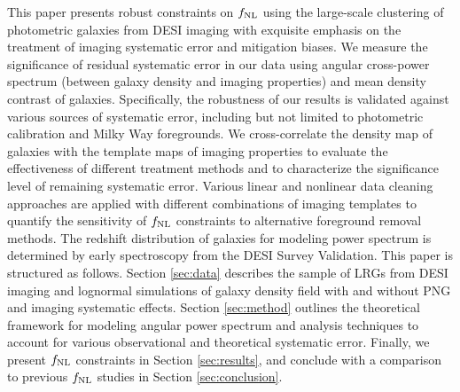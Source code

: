 This paper presents robust constraints on $f_{\rm NL}$ using the large-scale clustering of photometric galaxies from DESI imaging with exquisite emphasis on the treatment of imaging systematic error and mitigation biases. We measure the significance of residual systematic error in our data using angular cross-power spectrum (between galaxy density and imaging properties) and mean density contrast of galaxies. Specifically, the robustness of our results is validated against various sources of systematic error, including but not limited to photometric calibration and Milky Way foregrounds. We cross-correlate the density map of galaxies with the template maps of imaging properties to evaluate the effectiveness of different treatment methods and to characterize the significance level of remaining systematic error. Various linear and nonlinear data cleaning approaches are applied with different combinations of imaging templates to quantify the sensitivity of $f_{\rm NL}$ constraints to alternative foreground removal methods. The redshift distribution of galaxies for modeling power spectrum is determined by early spectroscopy from the DESI Survey Validation. This paper is structured as follows. Section \ref{sec:data} describes the sample of LRGs from DESI imaging and lognormal simulations of galaxy density field with and without PNG and imaging systematic effects. Section \ref{sec:method} outlines the theoretical framework for modeling angular power spectrum and analysis techniques to account for various observational and theoretical systematic error. Finally, we present $f_{\rm NL}$ constraints in Section \ref{sec:results}, and conclude with a comparison to previous $f_{\rm NL}$ studies in Section \ref{sec:conclusion}.
